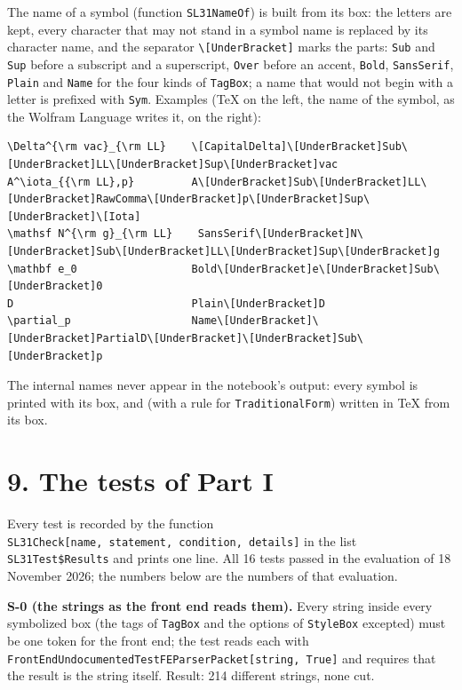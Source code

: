 \documentclass[
  10pt,
]{article}
\begin{document}
The name of a symbol (function \texttt{SL31NameOf}) is built from its
box: the letters are kept, every character that may not stand in a
symbol name is replaced by its character name, and the separator
\texttt{\textbackslash{}{[}UnderBracket{]}} marks the parts:
\texttt{Sub} and \texttt{Sup} before a subscript and a superscript,
\texttt{Over} before an accent, \texttt{Bold}, \texttt{SansSerif},
\texttt{Plain} and \texttt{Name} for the four kinds of \texttt{TagBox};
a name that would not begin with a letter is prefixed with \texttt{Sym}.
Examples (TeX on the left, the name of the symbol, as the Wolfram
Language writes it, on the right):

\begin{verbatim}
\Delta^{\rm vac}_{\rm LL}    \[CapitalDelta]\[UnderBracket]Sub\[UnderBracket]LL\[UnderBracket]Sup\[UnderBracket]vac
A^\iota_{{\rm LL},p}         A\[UnderBracket]Sub\[UnderBracket]LL\[UnderBracket]RawComma\[UnderBracket]p\[UnderBracket]Sup\[UnderBracket]\[Iota]
\mathsf N^{\rm g}_{\rm LL}    SansSerif\[UnderBracket]N\[UnderBracket]Sub\[UnderBracket]LL\[UnderBracket]Sup\[UnderBracket]g
\mathbf e_0                  Bold\[UnderBracket]e\[UnderBracket]Sub\[UnderBracket]0
D                            Plain\[UnderBracket]D
\partial_p                   Name\[UnderBracket]\[UnderBracket]PartialD\[UnderBracket]\[UnderBracket]Sub\[UnderBracket]p
\end{verbatim}

The internal names never appear in the notebook's output: every symbol
is printed with its box, and (with a rule for \texttt{TraditionalForm})
written in TeX from its box.

\hypertarget{the-tests-of-part-i}{%
\section{9. The tests of Part I}\label{the-tests-of-part-i}}

Every test is recorded by the function
\texttt{SL31Check{[}name,\ statement,\ condition,\ details{]}} in the
list \texttt{SL31\textasciigrave{}Test\textasciigrave{}\$Results} and
prints one line. All 16 tests passed in the evaluation of 18 November
2026; the numbers below are the numbers of that evaluation.

\textbf{S-0 (the strings as the front end reads them).} Every string
inside every symbolized box (the tags of \texttt{TagBox} and the options
of \texttt{StyleBox} excepted) must be one token for the front end; the
test reads each with
\texttt{FrontEnd\textasciigrave{}UndocumentedTestFEParserPacket{[}string,\ True{]}}
and requires that the result is the string itself. Result: 214 different
strings, none cut.
\end{document}
